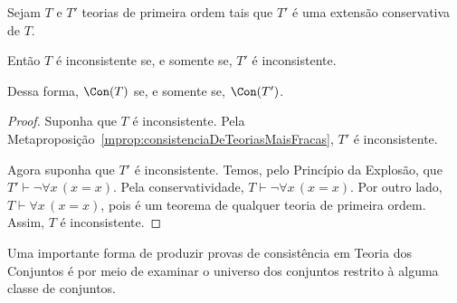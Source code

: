 \begin{proposition}
    Sejam $T$ e $T'$ teorias de primeira ordem tais que $T'$ é uma extensão conservativa de $T$.

    Então $T$ é inconsistente se, e somente se, $T'$ é inconsistente.

    Dessa forma, $\Con(T)$ se, e somente se, $\Con(T')$.
\end{proposition}
\begin{proof}
    Suponha que $T$ é inconsistente.
    Pela Metaproposição~\ref{mprop:consistenciaDeTeoriasMaisFracas}, $T'$ é inconsistente.

    Agora suponha que $T'$ é inconsistente.
    Temos, pelo Princípio da Explosão, que $T'\vdash \neg \forall x\, (x=x)$.
    Pela conservatividade, $T\vdash \neg \forall x\, (x=x)$.
    Por outro lado, $T\vdash \forall x\, (x=x)$, pois é um teorema de qualquer teoria de primeira ordem.
    Assim, $T$ é inconsistente.
\end{proof}

Uma importante forma de produzir provas de consistência em Teoria dos Conjuntos é por meio de examinar o universo dos conjuntos restrito à alguma classe de conjuntos.

